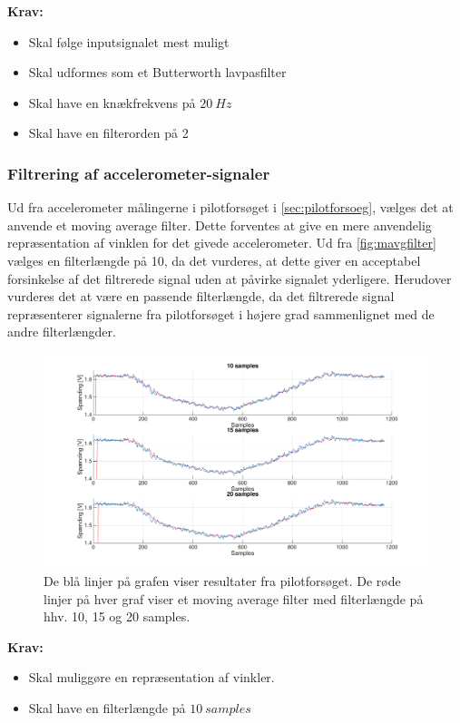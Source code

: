\vspace{3mm}

\textbf{Krav:}
\begin{itemize}
\item Skal følge inputsignalet mest muligt  
\item Skal udformes som et Butterworth lavpasfilter
\item Skal have en knækfrekvens på $20~Hz$
\item Skal have en filterorden på 2
\end{itemize}

\subsubsection{Filtrering af accelerometer-signaler}
Ud fra accelerometer målingerne i pilotforsøget i \autoref{sec:pilotforsoeg}, vælges det at anvende et moving average filter. Dette forventes at give en mere anvendelig repræsentation af vinklen for det givede accelerometer. Ud fra \autoref{fig:mavgfilter} vælges en filterlængde på 10, da det vurderes, at dette giver en acceptabel forsinkelse af det filtrerede signal uden at påvirke signalet yderligere. Herudover vurderes det at være en passende filterlængde, da det filtrerede signal repræsenterer signalerne fra pilotforsøget i højere grad sammenlignet med de andre filterlængder. 

\begin{figure} [H]
\centering
\includegraphics[width=1\textwidth]{figures/problemloesning/mavgfilter_matlab} 
\caption{De blå linjer på grafen viser resultater fra pilotforsøget. De røde linjer på hver graf viser et moving average filter med filterlængde på hhv. 10, 15 og 20 samples. }
\label{fig:mavgfilter}
\end{figure}

\vspace{3mm}

\textbf{Krav:}
\begin{itemize}
\item Skal muliggøre en repræsentation af vinkler. 
\item Skal have en filterlængde på $10~samples$
\end{itemize}